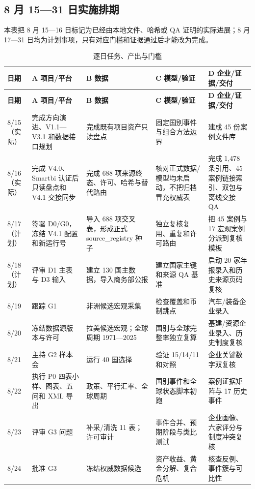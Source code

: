 \documentclass[UTF8,fontset=windows,12pt,openany]{ctexbook}
\begin{document}
\clearpage
\begin{landscape}
\chapter{8 月 15—31 日实施排期}

本表把 8 月 15—16 日标记为已经由本地文件、哈希或 QA 证明的实际进展；8 月 17—31 日均为计划事项，只有对应门槛和证据通过后才能改为完成。
\begin{longtable}{p{2.2cm}p{4.1cm}p{3.7cm}p{3.7cm}p{3.7cm}}
\caption{逐日任务、产出与门槛}\label{tab:schedule}\\
\toprule
\textbf{日期} & \textbf{A 项目/平台} & \textbf{B 数据} & \textbf{C 模型/验证} & \textbf{D 企业/证据/交付}\\
\midrule
\endfirsthead
\toprule \textbf{日期} & \textbf{A 项目/平台} & \textbf{B 数据} & \textbf{C 模型/验证} & \textbf{D 企业/证据/交付}\\ \midrule
\endhead
8/15（实际） & 完成方向演进、V1.1—V3.1 和数据接口规划 & 完成既有项目资产只读盘点 & 固定国别事件与组合方法边界 & 建成 45 份案例文件库\\
8/16（实际） & 完成 V4.0、Smartbi 认证后只读盘点和 V4.1 交接同步 & 完成 688 项来源终态、许可、哈希与替代路由 & 核对正式数据/模型均未启动，不把归档冒充权威表 & 完成 1,478 条引用、45 案例链接索引、双包与离线交接 QA\\
8/17（计划） & 签署 D0/G0，冻结 V4.1 配置和新运行号 & 导入 688 项交叉表，形成正式 source\_registry 种子 & 独立复核复用、重复和许可路由 & 把 45 案例与 17 宏观案例分派到复核模板\\
8/18（计划） & 评审 D1 主表与 D3 输入 & 建立 130 国主数据，导入商务部公报 & 建立国家主键和来源 QA 基准 & 启动 20 家年报录入和历史来源页码复核\\
8/19 & 跟踪 G1 & 非洲候选宏观采集 & 检查覆盖和币制跳点 & 汽车/装备企业录入\\
8/20 & 冻结数据源版本与许可 & 拉美候选宏观；全球周期 1971—2025 & 国别与全球完整率独立复算 & 基建/资源企业录入、历史制度复核\\
8/21 & 主持 G2 样本会 & 运行 40 国选择 & 验证 15/14/11 和对照 & 企业关键数字双复核\\
8/22 & 执行 P0 四表小样、图表、五问和 XML 导出 & 政策、平行汇率、全球周期 & 国别事件和全球状态脚本初跑 & 案例证据矩阵与 17 历史事件\\
8/23 & 评审 G3 问题 & 补采/清洗 11 表；许可审计 & 事件合并、预期阶段与类比测试 & 企业画像、六家评分与制度冲突复核\\
8/24 & 批准 G3 & 冻结权威数据候选 & 资产收益、黄金分解、复合危机 & 核查反例、事件簇与可比性\\

\end{longtable}
\end{landscape}
\end{document}

